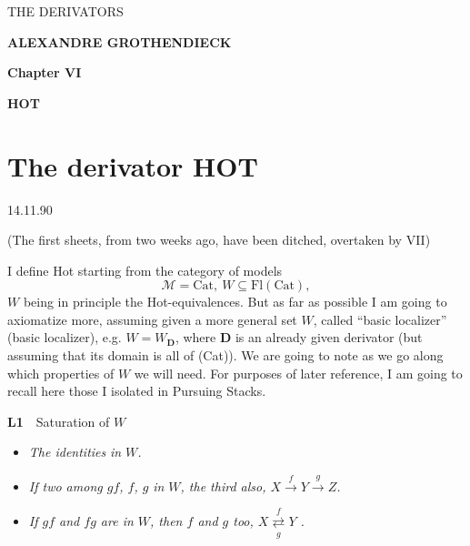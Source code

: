 \documentclass[11pt]{article}
\newcommand{\printedpage}[1]{\marginpar{\footnotesize p.~#1}}
\newcommand{\msp}[1]{\marginpar{\footnotesize [#1]}}
\begin{document}
\begin{center}
\printedpage{[no number]}%

\vspace*{6cm}

{\Large\textsf{THE DERIVATORS}}

\bigskip

\textbf{ALEXANDRE GROTHENDIECK}

\vspace{2cm}

\textbf{Chapter VI}

\medskip

\textbf{HOT}
\end{center}

\clearpage


\noindent\printedpage{1}
\msp{page 1}

\section*{\normalsize The derivator \textmd{HOT}}

\begin{flushright}
14.11.90
\end{flushright}

\begin{flushright}
(The first sheets, from two weeks ago, have been ditched, overtaken by VII)
\end{flushright}

\noindent I define Hot starting from the category of models
\[
\mathcal{M} = \mathrm{Cat},\ W \subseteq \mathrm{Fl}(\mathrm{Cat}),
\]
$W$ being in principle the Hot-equivalences. But as far as possible I am going to axiomatize more, assuming given a more general set $W$, called ``basic localizer'' (basic localizer), e.g. $W = W_{\mathbf{D}}$, where $\mathbf{D}$ is an already given derivator (but assuming that its domain is all of (Cat)). We are going to note as we go along which properties of $W$ we will need. For purposes of later reference, I am going to recall here those I isolated in Pursuing Stacks.

\noindent\textbf{L1}\ \ Saturation of $W$

\begin{itemize}[leftmargin=2.5em]
\item[a)] \textit{The identities} \textit{in $W$.}
\item[b)] \textit{If two among $gf$, $f$, $g$} \textit{in $W$, the third also, $X \xrightarrow{f} Y \xrightarrow{g} Z$.}
\item[c)] \textit{If $gf$ and $fg$ are in $W$, then $f$ and $g$ too, $X \overset{f}{\underset{g}{\rightleftarrows}} Y$ .}
\end{itemize}
\end{document}
